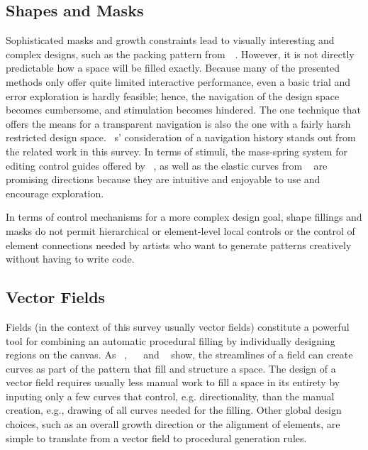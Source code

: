 \subsection{Shapes and Masks}
\label{subsubsec:analysis_creative_means_shapes}

Sophisticated masks and growth constraints lead to visually interesting and complex designs, such as the packing pattern from~\citeauthor*{saputra_2018_rde}~\cite{saputra_2018_rde}. However, it is not directly predictable how a space will be filled exactly. Because many of the presented methods only offer quite limited interactive performance, even a basic trial and error exploration is hardly feasible; hence, the navigation of the design space becomes cumbersome, and stimulation becomes hindered. The one technique \cite{santoni_2016_ggp} that offers the means for a transparent navigation is also the one with a fairly harsh restricted design space. \citeauthor*{santoni_2016_ggp}~\cite{santoni_2016_ggp}s' consideration of a navigation history stands out from the related work in this survey. In terms of stimuli, the mass-spring system for editing control guides offered by \citeauthor*{benes_2011_gpm}~\cite{benes_2011_gpm}, as well as the elastic curves from \citeauthor*{zehnder_2016_dso}~\cite{zehnder_2016_dso} are promising directions because they are intuitive and enjoyable to use and encourage exploration.

In terms of control mechanisms for a more complex design goal, shape fillings and masks do not permit hierarchical or element-level local controls or the control of element connections needed by artists who want to generate patterns creatively without having to write code.


\subsection{Vector Fields}
\label{subsubsec:analysis_creative_means_fields}

Fields (in the context of this survey usually vector fields) constitute a powerful tool for combining an automatic procedural filling by individually designing regions on the canvas. As \citeauthor*{hsu_2020_aef}~\cite{hsu_2020_aef}, ~\citeauthor*{saputra_2017_ffo}~\cite{saputra_2017_ffo} and \citeauthor*{gieseke_2017_ooo}~\cite{gieseke_2017_ooo} show, the streamlines of a field can create curves as part of the pattern that fill and structure a space. The design of a vector field requires usually less manual work to fill a space in its entirety by inputing only a few curves that control, e.g. directionality, than the manual creation, e.g., drawing of all curves needed for the filling. Other global design choices, such as an overall growth direction or the alignment of elements, are simple to translate from a vector field to procedural generation rules.

